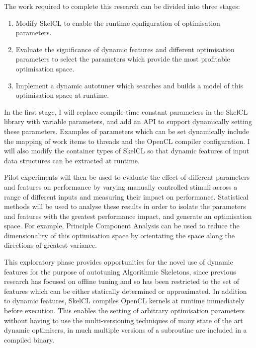 The work required to complete this research can be divided into three
stages:

\begin{enumerate}
\item Modify SkelCL to enable the runtime configuration of
  optimisation parameters.
\item Evaluate the significance of dynamic features and different
  optimisation parameters to select the parameters which provide the
  most profitable optimisation space.
\item Implement a dynamic autotuner which searches and builds a model
  of this optimisation space at runtime.
\end{enumerate}

In the first stage, I will replace compile-time constant parameters in
the SkelCL library with variable parameters, and add an API to support
dynamically setting these parameters. Examples of parameters which can
be set dynamically include the mapping of work items to threads and
the OpenCL compiler configuration. I will also modify the container
types of SkelCL so that dynamic features of input data structures can
be extracted at runtime.

Pilot experiments will then be used to evaluate the effect of
different parameters and features on performance by varying manually
controlled stimuli across a range of different inputs and measuring
their impact on performance. Statistical methods will be used to
analyse these results in order to isolate the parameters and features
with the greatest performance impact, and generate an optimisation
space. For example, Principle Component Analysis can be used to reduce
the dimensionality of this optimisation space by orientating the space
along the directions of greatest variance.

This exploratory phase provides opportunities for the novel use of
dynamic features for the purpose of autotuning Algorithmic Skeletons,
since previous research has focused on offline tuning and so has been
restricted to the set of features which can be either statically
determined or approximated. In addition to dynamic features, SkelCL
compiles OpenCL kernels at runtime immediately before execution. This
enables the setting of arbitrary optimisation parameters without
having to use the multi-versioning techniques of many state of the art
dynamic optimisers, in much multiple versions of a subroutine are
included in a compiled binary.

